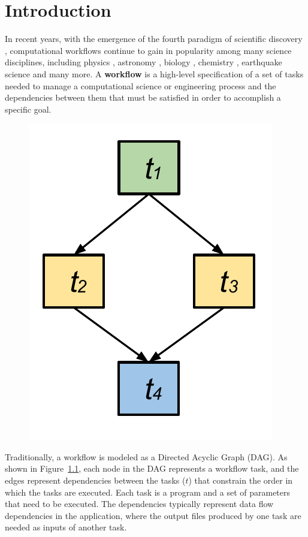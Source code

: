 \chapter{Introduction}


In recent years, with the emergence of the fourth paradigm of scientific discovery \cite{Hey2009}, computational workflows continue to gain in popularity among many science disciplines, including physics \cite{Deelman2002}, astronomy \cite{Sakellariou2010}, biology \cite{Lathers2006, Oinn2004}, chemistry \cite{Wieczorek2005}, earthquake science \cite{Maechling2007} and many more. 
A \textbf{workflow} is a high-level specification of a set of tasks needed to manage a computational science or engineering process and the dependencies between them that must be satisfied in order to accomplish a specific goal.


\begin{figure}[h!]
\includegraphics[width=0.3\linewidth]{figures/model/dag.pdf}
\centering
  \label{fig:model_dag}
\end{figure}

Traditionally, a workflow is modeled as a Directed Acyclic Graph (DAG). As shown in Figure~\ref{fig:model_dag}, each node in the DAG represents a workflow task, and the edges represent dependencies between the tasks ($t$) that constrain the order in which the tasks are executed. Each task is a program and a set of parameters that need to be executed. The dependencies typically represent data flow dependencies in the application, where the output files produced by one task are needed as inputs of another task. 


